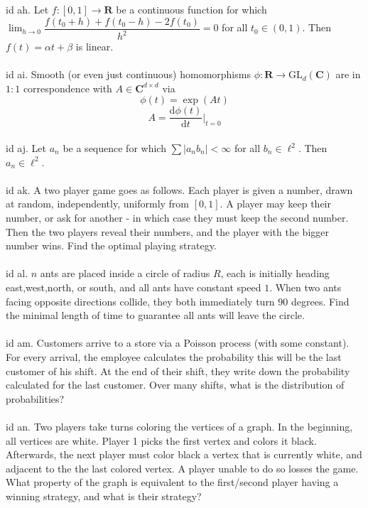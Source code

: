\documentclass[oneside]{book}
\newcommand{\R}{\mathbf{R}}
\newcommand{\C}{\mathbf{C}}
\newcommand{\GL}{\mathrm{GL}}
\renewcommand{\d}{\mathrm{d}}
\begin{document}
id ah. Let $f:[0,1]\to\R$ be a continuous function for which $\displaystyle\lim_{h\to0}\dfrac{f(t_0+h)+f(t_0-h)-2f(t_0)}{h^2}=0$ for all $t_0\in(0,1)$. Then $f(t)=\alpha t+\beta$ is linear.   \\\\


id ai. Smooth (or even just continuous) homomorphisms $\phi:\R\to\GL_d(\C)$ are in $1:1$ correspondence with $A\in\C^{d\times d}$ via $$\phi(t)=\exp(At)$$ $$A=\dfrac{\d \phi(t)}{\d t}\biggr\rvert_{t=0}$$ \\


id aj. Let $a_n$ be a sequence for which $\sum|a_nb_n|<\infty$ for all $b_n\in\ell^2$. Then $a_n\in\ell^2$.     \\\\


id ak. A two player game goes as follows. Each player is given a number, drawn at random, independently, uniformly from $[0,1]$. A player may keep their number, or ask for another - in which case they must keep the second number. Then the two players reveal their numbers, and the player with the bigger number wins. Find the optimal playing strategy.     \\\\


id al. $n$ ants are placed inside a circle of radius $R$, each is initially heading east,west,north, or south, and all ants have constant speed $1$. When two ants facing opposite directions collide, they both immediately turn $90$ degrees. Find the minimal length of time to guarantee all ants will leave the circle.        \\\\


id am. Customers arrive to a store via a Poisson process (with some constant). For every arrival, the employee calculates the probability this will be the last customer of his shift. At the end of their shift, they write down the probability calculated for the last customer. Over many shifts, what is the distribution of probabilities?    \\\\


id an. Two players take turns coloring the vertices of a graph. In the beginning, all vertices are white. Player 1 picks the first vertex and colors it black. Afterwards, the next player must color black a vertex that is currently white, and adjacent to the the last colored vertex. A player unable to do so losses the game. What property of the graph is equivalent to the first/second player having a winning strategy, and what is their strategy?     \\\\
\end{document}
